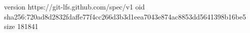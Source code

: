 version https://git-lfs.github.com/spec/v1
oid sha256:720ad8d2832fdaffe77f4cc266d3b3d1eea7043e874ac8853dd5641398b16be5
size 181841

